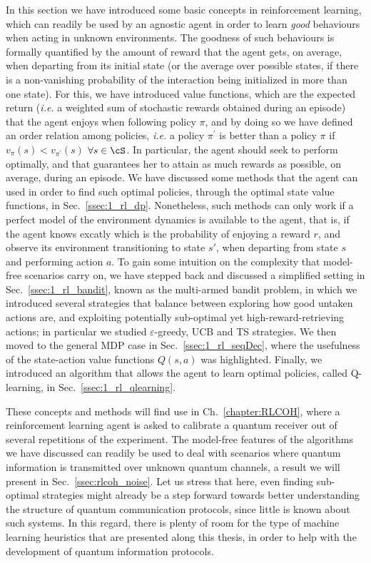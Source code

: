 In this section we have introduced some basic concepts in reinforcement learning, which can readily be used by an agnostic agent in order to learn \textit{good} behaviours when acting in unknown environments. The goodness of such behaviours is formally quantified by the amount of reward that the agent gets, on average, when departing from its initial state (or the average over possible states, if there is a non-vanishing probability of the interaction being initialized in more than one state). For this, we have introduced value functions, which are the expected return (\textit{i.e.} a weighted sum of stochastic rewards obtained during an episode) that the agent enjoys when following policy $\pi$, and by doing so we have defined an order relation among policies, \textit{i.e.} a policy $\pi^{'}$ is better than a policy $\pi$ if $v_\pi(s) < v_{\pi^{'}}(s)$ $\forall s\in\cS$. In particular, the agent should seek to perform optimally, and that guarantees her to attain as much rewards as possible, on average, during an episode. We have discussed some methods that the agent can used in order to find such optimal policies, through the optimal state value functions, in Sec.~\ref{ssec:1_rl_dp}. Nonetheless, such methods can only work if a perfect model of the environment dynamics is available to the agent, that is, if the agent knows excatly which is the probability of enjoying a reward $r$, and observe its environment transitioning to state $s'$, when departing from state $s$ and performing action $a$. To gain some intuition on the complexity that model-free scenarios carry on, we have stepped back and discussed a simplified setting in Sec.~\ref{ssec:1_rl_bandit}, known as the multi-armed bandit problem, in which we introduced several strategies that balance between exploring how good untaken actions are, and exploiting potentially sub-optimal yet high-reward-retrieving actions; in particular we studied
$\varepsilon$-greedy, UCB and TS strategies. We then moved to the general MDP case in Sec.~\ref{ssec:1_rl_seqDec}, where the usefulness of the state-action value functions $Q(s,a)$ was highlighted. Finally, we introduced an algorithm that allows the agent to learn optimal policies, called Q-learning, in Sec.~\ref{ssec:1_rl_qlearning}.

These concepts and methods will find use in Ch.~\ref{chapter:RLCOH}, where a reinforcement learning agent is asked to calibrate a quantum receiver out of several repetitions of the experiment. The model-free features of the algorithms we have discussed can readily be used to deal with scenarios where quantum information is transmitted over unknown quantum channels, a result we will present in Sec.~\ref{ssec:rlcoh_noise}. Let us stress that here, even finding sub-optimal strategies might already be a step forward towards better understanding the structure of quantum communication protocols, since little is known about such systems. In this regard, there is plenty of room for the type of machine learning heuristics that are presented along this thesis, in order to help with the development of quantum information protocols. %
